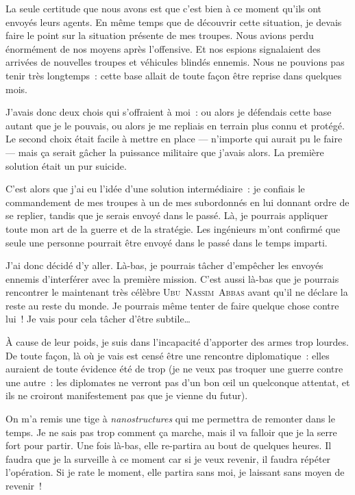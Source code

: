 {	La seule certitude que nous avons est que c’est bien à ce moment qu’ils ont envoyés leurs agents.
	En même temps que de découvrir cette situation, je devais faire le point sur la situation présente de mes troupes.
	Nous avions perdu énormément de nos moyens après l’offensive.  Et nos espions signalaient des arrivées de nouvelles troupes et véhicules blindés ennemis.
	Nous ne pouvions pas tenir très longtemps~:  cette base allait de toute façon être reprise dans quelques mois.

	J’avais donc deux chois qui s’offraient à moi~:  ou alors je défendais cette base autant que je le pouvais, ou alors je me repliais en terrain plus connu et protégé.
	Le second choix était facile à mettre en place — n’importe qui aurait pu le faire — mais ça serait gâcher la puissance militaire que j’avais alors.
	La première solution était un pur suicide.

	C’est alors que j’ai eu l’idée d’une solution intermédiaire~:  je confiais le commandement de mes troupes à un de mes subordonnés en lui donnant ordre de se replier, tandis que je serais envoyé dans le passé.
	Là, je pourrais appliquer toute mon art de la guerre et de la stratégie.
	Les ingénieurs m’ont confirmé que seule une personne pourrait être envoyé dans le passé dans le temps imparti.

	J’ai donc décidé d’y aller.
	Là-bas, je pourrais tâcher d’empêcher les envoyés ennemis d’interférer avec la première mission.
	C’est aussi là-bas que je pourrais rencontrer le maintenant très célèbre \textsc{Ubu~Nassim~Abbas} avant qu’il ne déclare la reste au reste du monde.
	Je pourrais même tenter de faire quelque chose contre lui~!
	Je vais pour cela tâcher d’être subtile…

	À cause de leur poids, je suis dans l’incapacité d’apporter des armes trop lourdes.
	De toute façon, là où je vais est censé être une rencontre diplomatique~:  elles auraient de toute évidence été de trop (je ne veux pas troquer une guerre contre une autre~:  les diplomates ne verront pas d’un bon œil un quelconque attentat, et ils ne croiront manifestement pas que je vienne du futur).

	On m’a remis une tige à \emph{nanostructures} qui me permettra de remonter dans le temps.
	Je ne sais pas trop comment ça marche, mais il va falloir que je la serre fort pour partir.
	Une fois là-bas, elle re-partira au bout de quelques heures.
	Il faudra que je la surveille à ce moment car si je veux revenir, il faudra répéter l’opération.
	Si je rate le moment, elle partira sans moi, je laissant sans moyen de revenir~!
}

